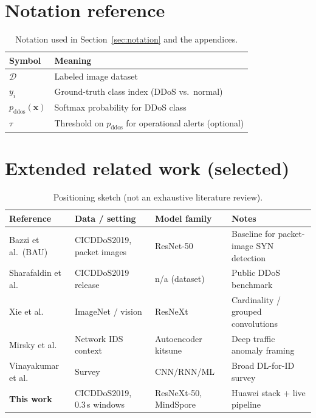 \section{Notation reference}
\begin{table}[ht]
\centering
\begin{tabular}{|l|l|}
\hline
\textbf{Symbol} & \textbf{Meaning} \\
\hline
$\mathcal{D}$ & Labeled image dataset \\
\hline
$y_i$ & Ground-truth class index (DDoS vs.\ normal) \\
\hline
$p_{\mathrm{ddos}}(\mathbf{x})$ & Softmax probability for DDoS class \\
\hline
$\tau$ & Threshold on $p_{\mathrm{ddos}}$ for operational alerts (optional) \\
\hline
\end{tabular}
\caption[Notation reference]{Notation used in Section~\ref{sec:notation} and the appendices.}
\label{tab:notationlist}
\end{table}

\section{Extended related work (selected)}
\begin{table}[ht]
\centering
\small
\begin{tabular}{|>{\raggedright\arraybackslash}p{2.6cm}|>{\raggedright\arraybackslash}p{3.0cm}|>{\raggedright\arraybackslash}p{3.0cm}|>{\raggedright\arraybackslash}p{3.6cm}|}
\hline
\textbf{Reference} & \textbf{Data / setting} & \textbf{Model family} & \textbf{Notes} \\
\hline
Bazzi et al.\ (BAU)~\cite{bazzi2022resnet} & CICDDoS2019, packet images & ResNet-50 & Baseline for packet-image SYN detection \\
\hline
Sharafaldin et al.~\cite{cic2019ddos} & CICDDoS2019 release & n/a (dataset) & Public DDoS benchmark \\
\hline
Xie et al.~\cite{xie2017aggregated} & ImageNet / vision & ResNeXt & Cardinality / grouped convolutions \\
\hline
Mirsky et al.~\cite{mirsky2019kitsune} & Network IDS context & Autoencoder kitsune & Deep traffic anomaly framing \\
\hline
Vinayakumar et al.~\cite{vinayakumar2019review} & Survey & CNN/RNN/ML & Broad DL-for-ID survey \\
\hline
\textbf{This work} & CICDDoS2019, 0.3\,s windows & ResNeXt-50, MindSpore & Huawei stack + live pipeline \\
\hline
\end{tabular}
\caption[Extended related-work positioning]{Positioning sketch (not an exhaustive literature review).}
\label{tab:extendedlit}
\end{table}

